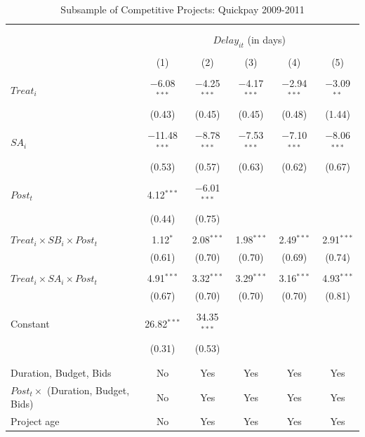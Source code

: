 \documentclass[]{article}
\begin{document}
\begin{table}[H] \centering 
  \caption{Subsample of Competitive Projects: Quickpay 2009-2011} 
  \label{} 
\small 
\begin{tabular}{@{\extracolsep{-2pt}}lccccc} 
\\[-1.8ex]\hline 
\hline \\[-1.8ex] 
\\[-1.8ex] & \multicolumn{5}{c}{$Delay_{it}$ (in days)} \\ 
\\[-1.8ex] & (1) & (2) & (3) & (4) & (5)\\ 
\hline \\[-1.8ex] 
 $Treat_i$ & $-$6.08$^{***}$ & $-$4.25$^{***}$ & $-$4.17$^{***}$ & $-$2.94$^{***}$ & $-$3.09$^{**}$ \\ 
  & (0.43) & (0.45) & (0.45) & (0.48) & (1.44) \\ 
  & & & & & \\ 
 $SA_i$ & $-$11.48$^{***}$ & $-$8.78$^{***}$ & $-$7.53$^{***}$ & $-$7.10$^{***}$ & $-$8.06$^{***}$ \\ 
  & (0.53) & (0.57) & (0.63) & (0.62) & (0.67) \\ 
  & & & & & \\ 
 $Post_t$ & 4.12$^{***}$ & $-$6.01$^{***}$ &  &  &  \\ 
  & (0.44) & (0.75) &  &  &  \\ 
  & & & & & \\ 
 $Treat_i \times SB_i \times Post_t$ & 1.12$^{*}$ & 2.08$^{***}$ & 1.98$^{***}$ & 2.49$^{***}$ & 2.91$^{***}$ \\ 
  & (0.61) & (0.70) & (0.70) & (0.69) & (0.74) \\ 
  & & & & & \\ 
 $Treat_i \times SA_i \times Post_t$ & 4.91$^{***}$ & 3.32$^{***}$ & 3.29$^{***}$ & 3.16$^{***}$ & 4.93$^{***}$ \\ 
  & (0.67) & (0.70) & (0.70) & (0.70) & (0.81) \\ 
  & & & & & \\ 
 Constant & 26.82$^{***}$ & 34.35$^{***}$ &  &  &  \\ 
  & (0.31) & (0.53) &  &  &  \\ 
  & & & & & \\ 
\hline \\[-1.8ex] 
Duration, Budget, Bids & No & Yes & Yes & Yes & Yes \\ 
$Post_t \times $  (Duration, Budget, Bids) & No & Yes & Yes & Yes & Yes \\ 
Project age & No & Yes & Yes & Yes & Yes \\ 

\end{tabular}
\end{table}
\end{document}
